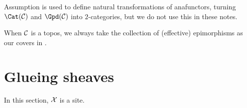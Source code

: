 \begin{appendices}
\begin{definitions}
  \end{definitions}

  \begin{remark}
    Assumption  is used to define natural
    transformations of anafunctors, turning $\Cat(\C)$ and $\Gpd(\C)$
    into $2$-categories, but we do not use this in these notes.
  \end{remark}

  \begin{convention}
    When $\mathcal{C}$ is a topos, we always take the collection of
    (effective) epimorphisms as our covers in .
  \end{convention}


  \section{Glueing sheaves}

  \begin{notation}
    In this section, $\mathcal{X}$ is a site.
  \end{notation}


\end{appendices}
